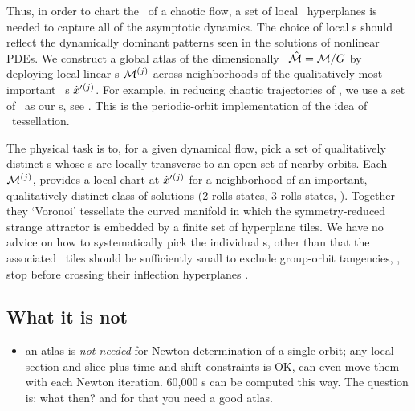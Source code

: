 Thus, in order to chart the \statesp\ of a chaotic flow, a set
of local \slice\ hyperplanes is needed to capture all of the asymptotic
dynamics. The choice of local \slice s should reflect the dynamically
dominant patterns seen in the solutions of nonlinear PDEs. We construct a
global atlas of the dimensionally \reducedsp\ $\hat{\cal M} = {\cal M}/G$ by
deploying local linear \slice s  ${\cal M}{}^{(j)}$ across neighborhoods of
the qualitatively most important \template\ {\cohStr s}
${\hat{x}'}{}^{(j)}$. For example, in reducing chaotic trajectories of
, we use a set of \reqva\ as our \template s, see
. This is the periodic-orbit implementation of the
idea of {\statesp\ tessellation}.

The physical task is to, for a given dynamical flow, pick a set of
qualitatively distinct {\template s} whose \slice s  are locally
transverse to an open set of nearby orbits. Each \slice\ ${\cal M}{}^{(j)}$,
provides a local chart at ${\hat{x}'}{}^{(j)}$ for a neighborhood of an
important, qualitatively distinct class of solutions (2-rolls states,
3-rolls states, \etc). Together they `Voronoi' tessellate  the curved
manifold in which the symmetry-reduced strange attractor is embedded by a
finite set of hyperplane tiles. We have no advice on how to
systematically pick the individual \template s, other than that the
associated \slice\ tiles should be sufficiently small to exclude
group-orbit tangencies, \ie, stop before crossing their inflection
hyperplanes .

\subsection{What it is not}
    \begin{itemize}
      \item an atlas is \emph{not needed} for Newton determination of a
            single orbit; any local section and slice plus time and shift
            constraints is OK, can even move them with each Newton
            iteration. 60,000 \rpo s can be computed this way.
            The question is: what then? and for that you need a good atlas.
    \end{itemize}
